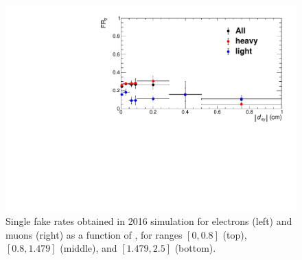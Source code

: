 \begin{figure}[t!]
  \hfill{}
  \includegraphics[width=.48\textwidth]{Figures/c6/backgrounds/FR/sFR/QCD/dxy_mu_eta3_FR2.pdf}
  \caption{Single fake rates obtained in 2016 simulation for electrons
    (left) and muons (right) as
    a function of \dxy, for \abseta ranges $[0,0.8]$ (top),
    $[0.8,1.479]$ (middle), and $[1.479,2.5]$ (bottom).}
  \label{fig:sFR_dxy}
\end{figure}

